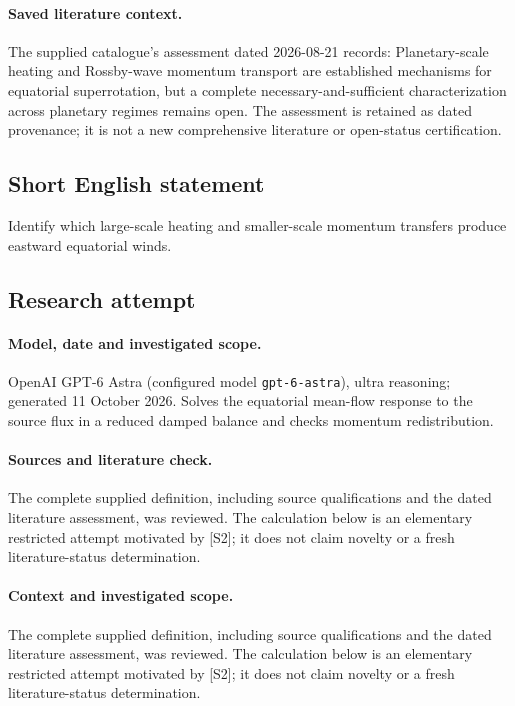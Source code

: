\documentclass[11pt]{article}
\begin{document}
\paragraph{Saved literature context.} The supplied catalogue's assessment dated 2026-08-21 records: Planetary-scale heating and Rossby-wave momentum transport are established mechanisms for equatorial superrotation, but a complete necessary-and-sufficient characterization across planetary regimes remains open. The assessment is retained as dated provenance; it is not a new comprehensive literature or open-status certification.
\subsection{Short English statement}
Identify which large-scale heating and smaller-scale momentum transfers produce eastward equatorial winds.
\subsection{Research attempt}
\paragraph{Model, date and investigated scope.}
OpenAI GPT-6 Astra (configured model \texttt{gpt-6-astra}), ultra reasoning; generated 11 October 2026. Solves the equatorial mean-flow response to the source flux in a reduced damped balance and checks momentum redistribution.

\paragraph{Sources and literature check.}
The complete supplied definition, including source qualifications and the dated literature assessment, was reviewed. The calculation below is an elementary restricted attempt motivated by [S2]; it does not claim novelty or a fresh literature-status determination.

\paragraph{Context and investigated scope.} The complete supplied definition, including source qualifications and the dated literature assessment, was reviewed. The calculation below is an elementary restricted attempt motivated by [S2]; it does not claim novelty or a fresh literature-status determination.
\end{document}
